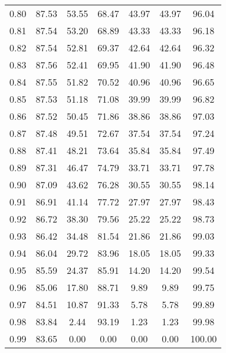 \begin{tabular}{|c|c|c|c|c|c|c|}
      0.80 &     87.53 &     53.55 &      68.47 &   43.97 &      43.97 &         96.04 \\
      0.81 &     87.54 &     53.20 &      68.89 &   43.33 &      43.33 &         96.18 \\
      0.82 &     87.54 &     52.81 &      69.37 &   42.64 &      42.64 &         96.32 \\
      0.83 &     87.56 &     52.41 &      69.95 &   41.90 &      41.90 &         96.48 \\
      0.84 &     87.55 &     51.82 &      70.52 &   40.96 &      40.96 &         96.65 \\
      0.85 &     87.53 &     51.18 &      71.08 &   39.99 &      39.99 &         96.82 \\
      0.86 &     87.52 &     50.45 &      71.86 &   38.86 &      38.86 &         97.03 \\
      0.87 &     87.48 &     49.51 &      72.67 &   37.54 &      37.54 &         97.24 \\
      0.88 &     87.41 &     48.21 &      73.64 &   35.84 &      35.84 &         97.49 \\
      0.89 &     87.31 &     46.47 &      74.79 &   33.71 &      33.71 &         97.78 \\
      0.90 &     87.09 &     43.62 &      76.28 &   30.55 &      30.55 &         98.14 \\
      0.91 &     86.91 &     41.14 &      77.72 &   27.97 &      27.97 &         98.43 \\
      0.92 &     86.72 &     38.30 &      79.56 &   25.22 &      25.22 &         98.73 \\
      0.93 &     86.42 &     34.48 &      81.54 &   21.86 &      21.86 &         99.03 \\
      0.94 &     86.04 &     29.72 &      83.96 &   18.05 &      18.05 &         99.33 \\
      0.95 &     85.59 &     24.37 &      85.91 &   14.20 &      14.20 &         99.54 \\
      0.96 &     85.06 &     17.80 &      88.71 &    9.89 &       9.89 &         99.75 \\
      0.97 &     84.51 &     10.87 &      91.33 &    5.78 &       5.78 &         99.89 \\
      0.98 &     83.84 &      2.44 &      93.19 &    1.23 &       1.23 &         99.98 \\
      0.99 &     83.65 &      0.00 &       0.00 &    0.00 &       0.00 &        100.00 \\
\bottomrule
\end{tabular}
